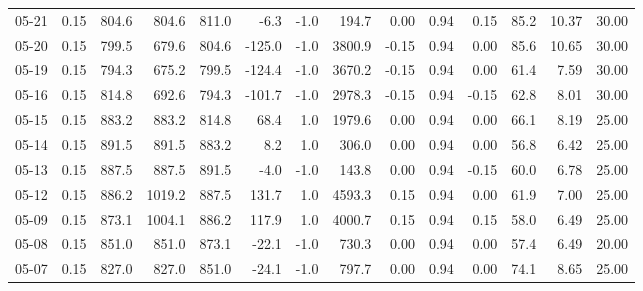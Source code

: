 \begin{threeparttable}
{\begin{tabular}{lrrrrrrrrrrrrr}
  05-21 &     0.15 & 804.6 &  804.6 & 811.0 &       -6.3 &                     -1.0 &               194.7 &       0.00 &      0.94 &           0.15 &             85.2 &           10.37 &                  30.00 \\
  05-20 &     0.15 & 799.5 &  679.6 & 804.6 &     -125.0 &                     -1.0 &              3800.9 &      -0.15 &      0.94 &           0.00 &             85.6 &           10.65 &                  30.00 \\
  05-19 &     0.15 & 794.3 &  675.2 & 799.5 &     -124.4 &                     -1.0 &              3670.2 &      -0.15 &      0.94 &           0.00 &             61.4 &            7.59 &                  30.00 \\
  05-16 &     0.15 & 814.8 &  692.6 & 794.3 &     -101.7 &                     -1.0 &              2978.3 &      -0.15 &      0.94 &          -0.15 &             62.8 &            8.01 &                  30.00 \\
  05-15 &     0.15 & 883.2 &  883.2 & 814.8 &       68.4 &                      1.0 &              1979.6 &       0.00 &      0.94 &           0.00 &             66.1 &            8.19 &                  25.00 \\
  05-14 &     0.15 & 891.5 &  891.5 & 883.2 &        8.2 &                      1.0 &               306.0 &       0.00 &      0.94 &           0.00 &             56.8 &            6.42 &                  25.00 \\
  05-13 &     0.15 & 887.5 &  887.5 & 891.5 &       -4.0 &                     -1.0 &               143.8 &       0.00 &      0.94 &          -0.15 &             60.0 &            6.78 &                  25.00 \\
  05-12 &     0.15 & 886.2 & 1019.2 & 887.5 &      131.7 &                      1.0 &              4593.3 &       0.15 &      0.94 &           0.00 &             61.9 &            7.00 &                  25.00 \\
  05-09 &     0.15 & 873.1 & 1004.1 & 886.2 &      117.9 &                      1.0 &              4000.7 &       0.15 &      0.94 &           0.15 &             58.0 &            6.49 &                  25.00 \\
  05-08 &     0.15 & 851.0 &  851.0 & 873.1 &      -22.1 &                     -1.0 &               730.3 &       0.00 &      0.94 &           0.00 &             57.4 &            6.49 &                  20.00 \\
  05-07 &     0.15 & 827.0 &  827.0 & 851.0 &      -24.1 &                     -1.0 &               797.7 &       0.00 &      0.94 &           0.00 &             74.1 &            8.65 &                  25.00 \\

\end{tabular}}
\end{threeparttable}
